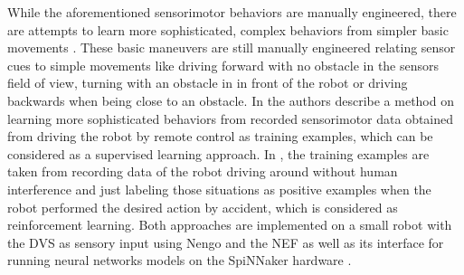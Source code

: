 While the aforementioned sensorimotor behaviors are manually engineered, there are attempts to learn more sophisticated, complex behaviors from simpler basic movements \cite{Conradt2014, Stewart2016}.
These basic maneuvers are still manually engineered relating sensor cues to simple movements like driving forward with no obstacle in the sensors field of view, turning with an obstacle in in front of the robot or driving backwards when being close to an obstacle.
In \cite{Conradt2014} the authors describe a method on learning more sophisticated behaviors from recorded sensorimotor data obtained from driving the robot by remote control as training examples, which can be considered as a supervised learning approach.
In \cite{Stewart2016}, the training examples are taken from recording data of the robot driving around without human interference and just labeling those situations as positive examples when the robot performed the desired action by accident, which is considered as reinforcement learning.
Both approaches are implemented on a small robot with the \ac{DVS} as sensory input using \ac{Nengo} and the \ac{NEF} as well as its interface \cite{Mundy2015} for running neural networks models on the \ac{SpiNNaker} hardware \cite{Furber2014}.
